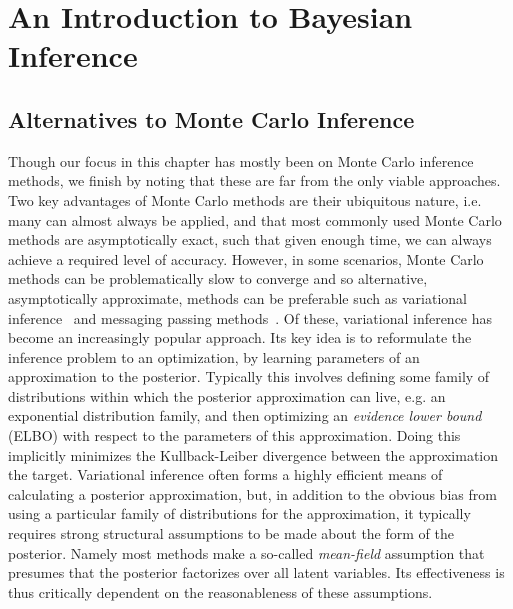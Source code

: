 
\chapter{An Introduction to Bayesian Inference}
\label{chp:inf}





\section{Alternatives to Monte Carlo Inference}
\label{sec:inf:alt}

Though our focus in this chapter has mostly been on Monte Carlo inference methods, we finish
by noting that these are far from the only viable approaches.  Two key advantages of Monte Carlo
methods are their ubiquitous nature, i.e. many can almost always be applied, 
and that most commonly used Monte Carlo methods are asymptotically exact, such that given
enough time, we can always achieve a required level of accuracy.  However, in some scenarios,
Monte Carlo methods can be problematically slow to converge and so alternative, asymptotically approximate,
methods can be preferable such as variational inference~\citep{blei2016variational} and
 messaging passing methods~\citep{lauritzen1988local}.  Of these, variational inference has become an increasingly
 popular approach.  Its key idea is to reformulate the inference problem to 
an optimization, by learning parameters of an approximation to the posterior.  Typically this involves
defining some family  of distributions within which the posterior approximation can live, e.g. an exponential
distribution family, and then optimizing an \emph{evidence lower bound} (ELBO) with respect to the parameters of
this approximation.  Doing this implicitly minimizes
the Kullback-Leiber divergence between the approximation the target.
Variational inference often forms a highly efficient means of calculating a posterior approximation, but,
in addition to the obvious bias from using a particular family of distributions for the approximation, it typically
requires strong structural assumptions to be made about the form of the posterior. Namely most methods make a
so-called \emph{mean-field} assumption that presumes that the posterior factorizes over all
latent variables.  Its effectiveness is thus critically dependent on the reasonableness of these assumptions.

